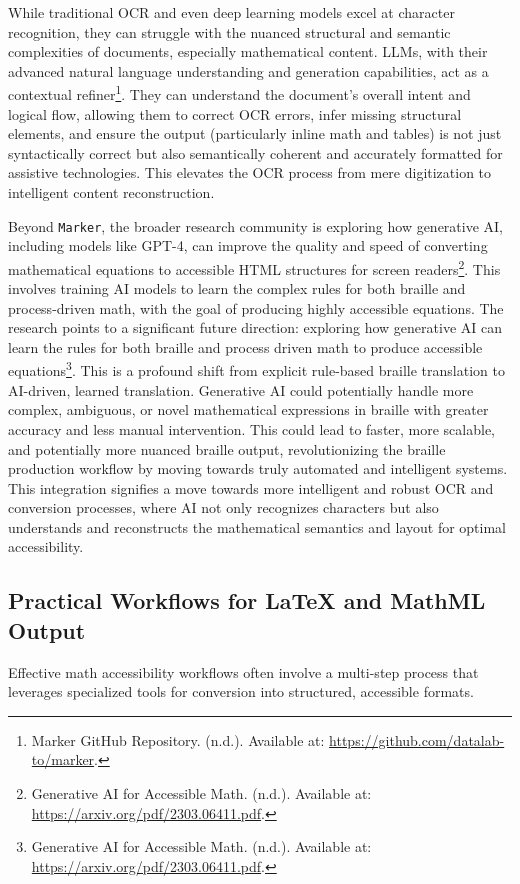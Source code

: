 While traditional OCR and even deep learning models excel at character recognition, they can struggle with the nuanced structural and semantic complexities of documents, especially mathematical content. LLMs, with their advanced natural language understanding and generation capabilities, act as a contextual refiner\footnote{Marker GitHub Repository. (n.d.). Available at: \url{https://github.com/datalab-to/marker}.}. They can understand the document's overall intent and logical flow, allowing them to correct OCR errors, infer missing structural elements, and ensure the output (particularly inline math and tables) is not just syntactically correct but also semantically coherent and accurately formatted for assistive technologies. This elevates the OCR process from mere digitization to intelligent content reconstruction.

Beyond \texttt{Marker}, the broader research community is exploring how generative AI, including models like GPT-4, can improve the quality and speed of converting mathematical equations to accessible HTML structures for screen readers\footnote{Generative AI for Accessible Math. (n.d.). Available at: \url{https://arxiv.org/pdf/2303.06411.pdf}.}. This involves training AI models to learn the complex rules for both braille and process-driven math, with the goal of producing highly accessible equations. The research points to a significant future direction: exploring how generative AI can learn the rules for both braille and process driven math to produce accessible equations\footnote{Generative AI for Accessible Math. (n.d.). Available at: \url{https://arxiv.org/pdf/2303.06411.pdf}.}. This is a profound shift from explicit rule-based braille translation to AI-driven, learned translation. Generative AI could potentially handle more complex, ambiguous, or novel mathematical expressions in braille with greater accuracy and less manual intervention. This could lead to faster, more scalable, and potentially more nuanced braille output, revolutionizing the braille production workflow by moving towards truly automated and intelligent systems. This integration signifies a move towards more intelligent and robust OCR and conversion processes, where AI not only recognizes characters but also understands and reconstructs the mathematical semantics and layout for optimal accessibility.

\subsection{Practical Workflows for LaTeX and MathML Output}
Effective math accessibility workflows often involve a multi-step process that leverages specialized tools for conversion into structured, accessible formats.

